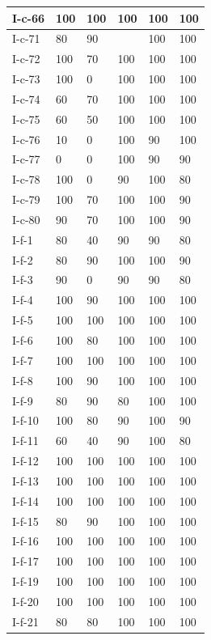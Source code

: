\documentclass[11pt,a4paper]{article}
\begin{document}
\begin{table}[h]
\begin{tabular}{|l|l|l|l|l|l|}
I-c-66 & 100 & 100 & 100 & 100 & 100 \\ \hline
I-c-71 & 80 & 90 &  & 100 & 100 \\ \hline
I-c-72 & 100 & 70 & 100 & 100 & 100 \\ \hline
I-c-73 & 100 & 0 & 100 & 100 & 100 \\ \hline
I-c-74 & 60 & 70 & 100 & 100 & 100 \\ \hline
I-c-75 & 60 & 50 & 100 & 100 & 100 \\ \hline
I-c-76 & 10 & 0 & 100 & 90 & 100 \\ \hline
I-c-77 & 0 & 0 & 100 & 90 & 90 \\ \hline
I-c-78 & 100 & 0 & 90 & 100 & 80 \\ \hline
I-c-79 & 100 & 70 & 100 & 100 & 90 \\ \hline
I-c-80 & 90 & 70 & 100 & 100 & 90 \\ \hline
I-f-1 & 80 & 40 & 90 & 90 & 80 \\ \hline
I-f-2 & 80 & 90 & 100 & 100 & 90 \\ \hline
I-f-3 & 90 & 0 & 90 & 90 & 80 \\ \hline
I-f-4 & 100 & 90 & 100 & 100 & 100 \\ \hline
I-f-5 & 100 & 100 & 100 & 100 & 100 \\ \hline
I-f-6 & 100 & 80 & 100 & 100 & 100 \\ \hline
I-f-7 & 100 & 100 & 100 & 100 & 100 \\ \hline
I-f-8 & 100 & 90 & 100 & 100 & 100 \\ \hline
I-f-9 & 80 & 90 & 80 & 100 & 100 \\ \hline
I-f-10 & 100 & 80 & 90 & 100 & 90 \\ \hline
I-f-11 & 60 & 40 & 90 & 100 & 80 \\ \hline
I-f-12 & 100 & 100 & 100 & 100 & 100 \\ \hline
I-f-13 & 100 & 100 & 100 & 100 & 100 \\ \hline
I-f-14 & 100 & 100 & 100 & 100 & 100 \\ \hline
I-f-15 & 80 & 90 & 100 & 100 & 100 \\ \hline
I-f-16 & 100 & 100 & 100 & 100 & 100 \\ \hline
I-f-17 & 100 & 100 & 100 & 100 & 100 \\ \hline
I-f-19 & 100 & 100 & 100 & 100 & 100 \\ \hline
I-f-20 & 100 & 100 & 100 & 100 & 100 \\ \hline
I-f-21 & 80 & 80 & 100 & 100 & 100 \\ \hline

\end{tabular}
\end{table}
\end{document}
